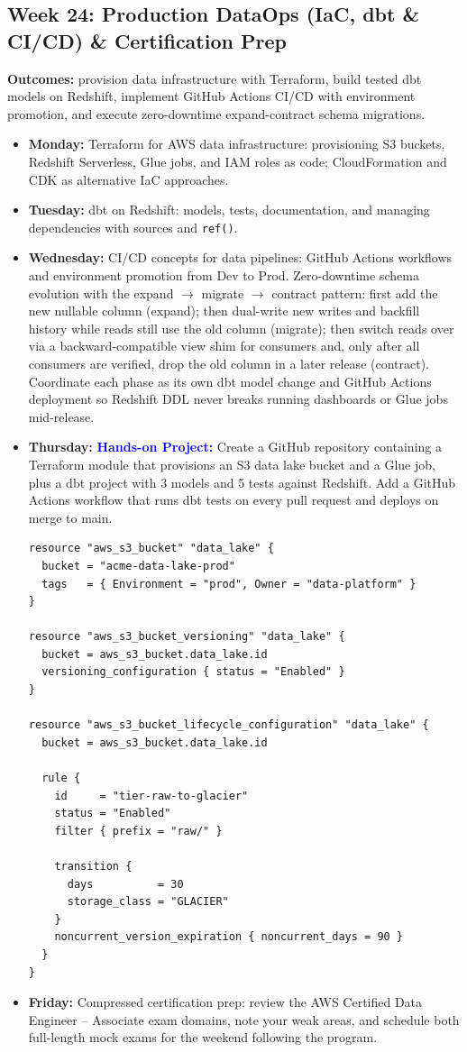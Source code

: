 \documentclass[11pt, a4paper]{article}
\newcommand{\project}[1]{\vspace{1mm}\noindent\textbf{\textcolor{blue}{Hands-on Project:}} #1}
\newcommand{\dayitem}[2]{\item \textbf{#1:} #2}
\begin{document}
\subsection*{Week 24: Production DataOps (IaC, dbt \& CI/CD) \& Certification Prep}
\par\noindent\textbf{Outcomes:} provision data infrastructure with Terraform, build tested dbt models on Redshift, implement GitHub Actions CI/CD with environment promotion, and execute zero-downtime expand-contract schema migrations.
\begin{itemize}[label=-]
    \dayitem{Monday}{Terraform for AWS data infrastructure: provisioning S3 buckets, Redshift Serverless, Glue jobs, and IAM roles as code; CloudFormation and CDK as alternative IaC approaches.}
    \dayitem{Tuesday}{dbt on Redshift: models, tests, documentation, and managing dependencies with sources and \texttt{ref()}.}
    \dayitem{Wednesday}{CI/CD concepts for data pipelines: GitHub Actions workflows and environment promotion from Dev to Prod. Zero-downtime schema evolution with the expand $\rightarrow$ migrate $\rightarrow$ contract pattern: first add the new nullable column (expand); then dual-write new writes and backfill history while reads still use the old column (migrate); then switch reads over via a backward-compatible view shim for consumers and, only after all consumers are verified, drop the old column in a later release (contract). Coordinate each phase as its own dbt model change and GitHub Actions deployment so Redshift DDL never breaks running dashboards or Glue jobs mid-release.}
    \dayitem{Thursday}{\project{Create a GitHub repository containing a Terraform module that provisions an S3 data lake bucket and a Glue job, plus a dbt project with 3 models and 5 tests against Redshift. Add a GitHub Actions workflow that runs dbt tests on every pull request and deploys on merge to main.}}

\begin{lstlisting}
resource "aws_s3_bucket" "data_lake" {
  bucket = "acme-data-lake-prod"
  tags   = { Environment = "prod", Owner = "data-platform" }
}

resource "aws_s3_bucket_versioning" "data_lake" {
  bucket = aws_s3_bucket.data_lake.id
  versioning_configuration { status = "Enabled" }
}

resource "aws_s3_bucket_lifecycle_configuration" "data_lake" {
  bucket = aws_s3_bucket.data_lake.id

  rule {
    id     = "tier-raw-to-glacier"
    status = "Enabled"
    filter { prefix = "raw/" }

    transition {
      days          = 30
      storage_class = "GLACIER"
    }
    noncurrent_version_expiration { noncurrent_days = 90 }
  }
}
\end{lstlisting}

    \dayitem{Friday}{Compressed certification prep: review the AWS Certified Data Engineer -- Associate exam domains, note your weak areas, and schedule both full-length mock exams for the weekend following the program.}
\end{itemize}
\end{document}
